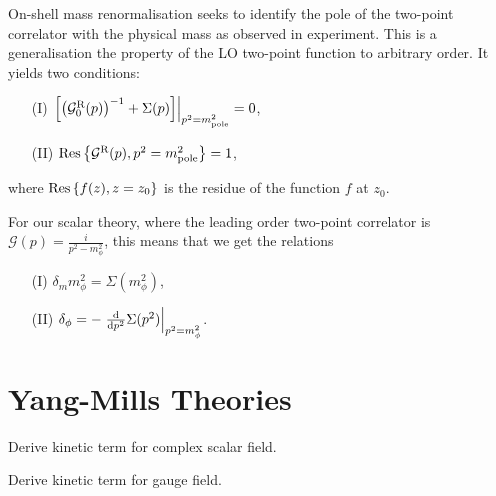 \documentclass[../main.tex]{subfiles}
\begin{document}
On-shell mass renormalisation seeks to identify the pole of the two-point
correlator with the physical mass as observed in experiment. This is a
generalisation the property of the LO two-point function to arbitrary order. It
yields two conditions:
\begin{center}
    \begin{itemize}
        \item [(I)] \(\evalat{\bclosed{\pclosed{\mathcal{G}^\text{R}_0(p)}^{-1}
                      + \Sigma(p)}}{p^2 = m_\text{pole}^2} = 0\),
        \item [(II)] \(\operatorname{Res}\cclosed{\mathcal{G}^\text{R}(p), p^2
                  = m_\text{pole}^2} = 1\),
    \end{itemize}
\end{center}
where \(\operatorname{Res}\cclosed{f(z), z = z_0}\) is the residue of the
function \(f\) at \(z_0\).
\medskip

For our scalar theory, where the leading order two-point correlator is
\(\mathcal{G}(p) = \frac{i}{p^2 - m_\phi^2}\), this means that we get the
relations
\begin{center}
    \begin{itemize}
        \item [(I)] \(\delta_m m_\phi^2 = \Sigma(m_\phi^2)\),
        \item [(II)] \(\delta_\phi = -\evalat{\d[p^2]{}\Sigma(p^2)}{p^2 =
                  m_\phi^2}\).
    \end{itemize}
\end{center}
\provethis{}



\section{Yang-Mills Theories}
\begin{TODO}
    \item [\checked] Derive kinetic term for complex scalar field.
    \item Derive kinetic term for gauge field.
\end{TODO}
\end{document}
